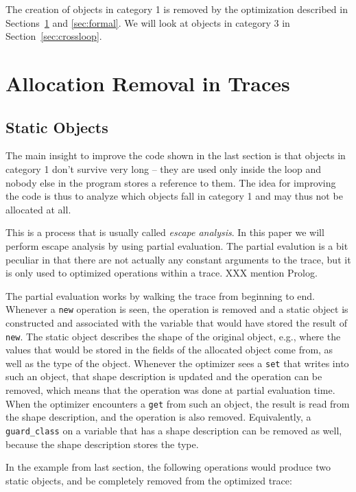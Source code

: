 \documentclass{sigplanconf}
\newcommand\eg{e.g.,\xspace}
\begin{document}
The creation of objects in category 1 is removed by the optimization described
in Sections~\ref{sec:statics} and \ref{sec:formal}. We will look at objects in
category 3 in Section~\ref{sec:crossloop}.

\section{Allocation Removal in Traces}
\label{sec:statics}

\subsection{Static Objects}

The main insight to improve the code shown in the last section is that objects
in category 1 don't survive very long -- they are used only inside the loop and
nobody else in the program stores a reference to them. The idea for improving
the code is thus to analyze which objects fall in category 1 and may thus
not be allocated at all.

This is a process that is usually called \emph{escape analysis}. In this paper we will
perform escape analysis by using partial evaluation. The partial evalution is a
bit peculiar in that there are not actually any constant arguments to the trace,
but it is only used to optimized operations within a trace. XXX mention Prolog.

The partial evaluation works by walking the trace from beginning to end.
Whenever a \texttt{new} operation is seen, the operation is removed and a static
object is constructed and associated with the variable that would have stored
the result of \texttt{new}. The static object describes the shape of the
original object, \eg where the values that would be stored in the fields of the
allocated object come from, as well as the type of the object. Whenever the
optimizer sees a \texttt{set} that writes into such an object, that shape
description is updated and the operation can be removed, which means that the
operation was done at partial evaluation time. When the optimizer encounters a
\texttt{get} from such an object, the result is read from the shape
description, and the operation is also removed. Equivalently, a
\texttt{guard\_class} on a variable that has a shape description can be removed
as well, because the shape description stores the type.

In the example from last section, the following operations would produce two
static objects, and be completely removed from the optimized trace:
\end{document}
